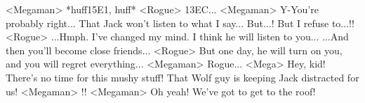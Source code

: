<Megaman> *huff{15}{E1}, huff* 
<Rogue> {13}{EC}... 
<Megaman> Y-You're probably right... 
That Jack won't listen to what I say... 
But...! 
But I refuse to...!! 
<Rogue> ...Hmph. I've changed my mind. 
I think he will listen to you... 
...And then you'll become close friends... 
<Rogue> But one day, he will turn on you, and you will regret everything... 
<Megaman> Rogue... 
<Mega> Hey, kid! There's no time for this mushy stuff! 
That Wolf guy is keeping Jack distracted for us! 
<Megaman> !! 
<Megaman> Oh yeah! We've got to get to the roof! 
